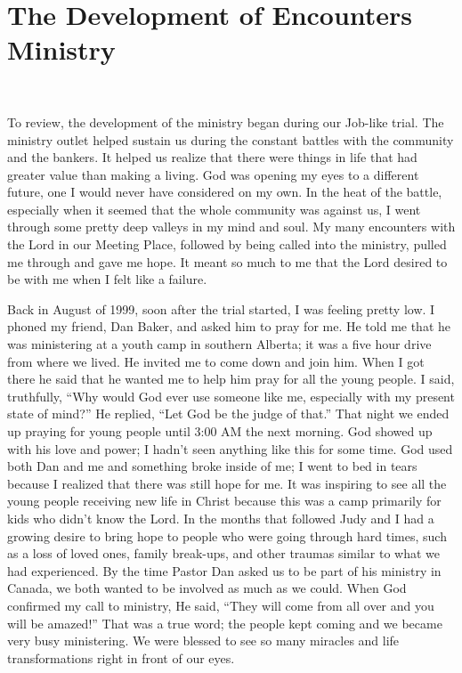 \documentclass[oneside]{book}
\begin{document}
\chapter{The Development of Encounters Ministry}
\

To review, the development of the ministry began during our Job-like trial. The ministry outlet helped sustain us during the constant battles with the community and the bankers. It helped us realize that there were things in life that had greater value than making a living. God was opening my eyes to a different future, one I would never have considered on my own. In the heat of the battle, especially when it seemed that the whole community was against us, I went through some pretty deep valleys in my mind and soul. My many encounters with the Lord in our Meeting Place, followed by being called into the ministry, pulled me through and gave me hope. It meant so much to me that the Lord desired to be with me when I felt like a failure. 

Back in August of 1999, soon after the trial started, I was feeling pretty low. I phoned my friend, Dan Baker, and asked him to pray for me. He told me that he was ministering at a youth camp in southern Alberta; it was a five hour drive from where we lived. He invited me to come down and join him. When I got there he said that he wanted me to help him pray for all the young people. I said, truthfully, “Why would God ever use someone like me, especially with my present state of mind?” He replied, “Let God be the judge of that.” That night we ended up praying for young people until 3:00 AM the next morning. God showed up with his love and power; I hadn’t seen anything like this for some time. God used both Dan and me and something broke inside of me; I went to bed in tears because I realized that there was still hope for me. It was inspiring to see all the young people receiving new life in Christ because this was a camp primarily for kids who didn’t know the Lord. In the months that followed Judy and I had a growing desire to bring hope to people who were going through hard times, such as a loss of loved ones, family break-ups, and other traumas similar to what we had experienced. By the time Pastor Dan asked us to be part of his ministry in Canada, we both wanted to be involved as much as we could. When God confirmed my call to ministry, He said, “They will come from all over and you will be amazed!” That was a true word; the people kept coming and we became very busy ministering. We were blessed to see so many miracles and life transformations right in front of our eyes. 
\end{document}
